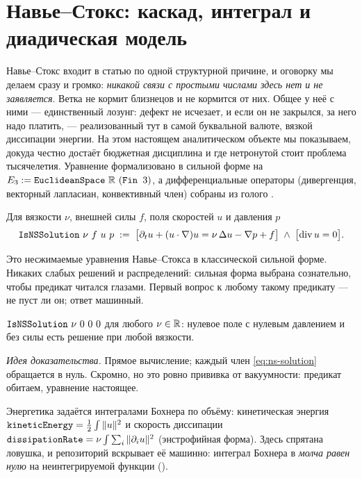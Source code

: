 \section{Навье--Стокс: каскад, интеграл и диадическая модель}\label{sec:ns}

Навье--Стокс входит в статью по одной структурной причине, и оговорку мы делаем сразу и громко:
\emph{никакой связи с простыми числами здесь нет и не заявляется}. Ветка не кормит близнецов и не
кормится от них. Общее у неё с ними --- единственный лозунг: дефект не исчезает, и если он не
закрылся, за него надо платить, --- реализованный тут в самой буквальной валюте, вязкой диссипации
энергии. На этом настоящем аналитическом объекте мы показываем, докуда честно достаёт бюджетная
дисциплина и где нетронутой стоит проблема тысячелетия. Уравнение формализовано в сильной форме на
$E_3 := \texttt{EuclideanSpace}\ \mathbb{R}\ (\texttt{Fin }3)$, а дифференциальные операторы (дивергенция,
векторный лапласиан, конвективный член) собраны из голого .

\begin{definition}\label{def:IsNSSolution}
Для вязкости $\nu$, внешней силы $f$, поля скоростей $u$ и давления $p$
\begin{equation}\label{eq:ns-solution}
\texttt{IsNSSolution}\ \nu\ f\ u\ p \;:=\;
\bigl[\partial_t u + (u\cdot\nabla)u = \nu\,\Delta u - \nabla p + f\bigr]
\;\wedge\; \bigl[\operatorname{div} u = 0\bigr].
\end{equation}
\end{definition}

\noindent Это несжимаемые уравнения Навье--Стокса \cite{clay-ns,millennium} в классической сильной
форме. Никаких слабых решений и распределений: сильная форма выбрана сознательно, чтобы предикат
читался глазами. Первый вопрос к любому такому предикату --- не пуст ли он; ответ машинный.

\begin{theorem}\label{thm:zero_is_NSSolution}
$\texttt{IsNSSolution}\ \nu\ 0\ 0\ 0$ для любого $\nu \in \mathbb{R}$: нулевое поле с нулевым давлением и без
силы есть решение при любой вязкости. \green{}
\end{theorem}

\emph{Идея доказательства.} Прямое вычисление; каждый член \cref{eq:ns-solution} обращается в нуль.
Скромно, но это ровно прививка от вакуумности: предикат обитаем, уравнение настоящее.

Энергетика задаётся интегралами Бохнера по объёму: кинетическая энергия
$\texttt{kineticEnergy} = \tfrac12\int\|u\|^2$ и скорость диссипации
$\texttt{dissipationRate} = \nu\int\sum_i\|\partial_i u\|^2$ (энстрофийная форма). Здесь спрятана
ловушка, и репозиторий вскрывает её машинно: интеграл Бохнера в  \emph{молча равен
нулю} на неинтегрируемой функции ().

